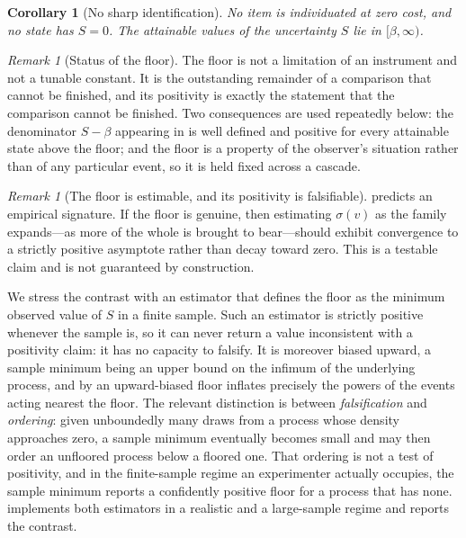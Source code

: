 \documentclass[11pt,a4paper]{article}
\theoremstyle{thmstyle}
\newtheorem{corollary}[theorem]{Corollary}
\theoremstyle{definition}
\theoremstyle{remark}
\newtheorem{remark}[theorem]{Remark}
\newcommand{\flo}{\beta}
\newcommand{\sep}{\sigma}
\begin{document}
\begin{corollary}[No sharp identification]
\label{cor:nosharp}
No item is individuated at zero cost, and no state has $S=0$. The attainable
values of the uncertainty $S$ lie in $[\flo,\infty)$.
\end{corollary}

\begin{remark}[Status of the floor]
\label{rem:floor-status}
The floor is not a limitation of an instrument and not a tunable constant.
It is the outstanding remainder of a comparison that cannot be finished, and
its positivity is exactly the statement that the comparison cannot be
finished. Two consequences are used repeatedly below: the denominator
$S-\flo$ appearing in  is well defined and positive for
every attainable state above the floor; and the floor is a property of the
observer's situation rather than of any particular event, so it is held
fixed across a cascade.
\end{remark}

\begin{remark}[The floor is estimable, and its positivity is falsifiable]
\label{rem:floor-empirical}
 predicts an empirical signature. If the floor is
genuine, then estimating $\sep(v)$ as the family expands---as more of the
whole is brought to bear---should exhibit convergence to a strictly positive
asymptote rather than decay toward zero. This is a testable claim and is not
guaranteed by construction.

We stress the contrast with an estimator that defines the floor as the
minimum observed value of $S$ in a finite sample. Such an estimator is
strictly positive whenever the sample is, so it can never return a value
inconsistent with a positivity claim: it has no capacity to falsify. It is
moreover biased upward, a sample minimum being an upper bound on the infimum
of the underlying process, and by  an
upward-biased floor inflates precisely the powers of the events acting
nearest the floor. The relevant distinction is between \emph{falsification}
and \emph{ordering}: given unboundedly many draws from a process whose
density approaches zero, a sample minimum eventually becomes small and may
then order an unfloored process below a floored one. That ordering is not a
test of positivity, and in the finite-sample regime an experimenter actually
occupies, the sample minimum reports a confidently positive floor for a
process that has none.  implements both estimators in a
realistic and a large-sample regime and reports the contrast.
\end{remark}
\end{document}
